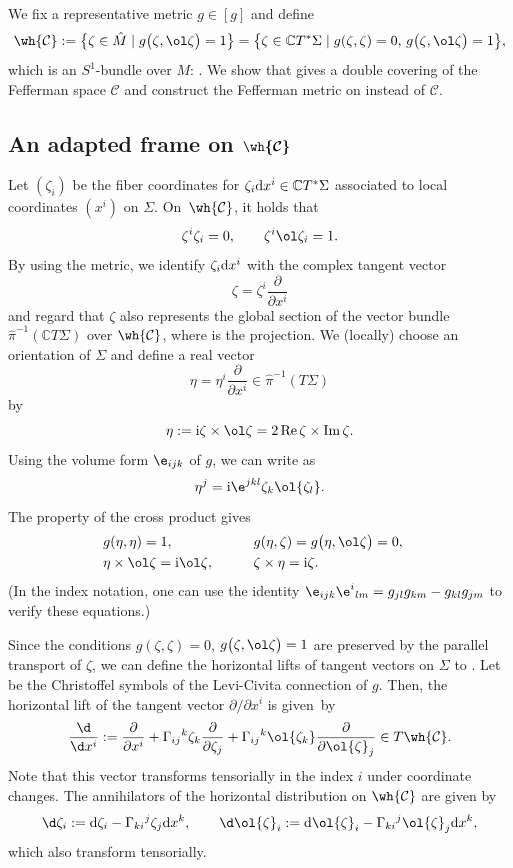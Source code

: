 We fix a representative metric $g\in[g]$ and define
\[
\wh{\mathcal{C}}:=\bigl\{\zeta\in \hat M\mid g\bigl(\zeta, \ol\zeta\bigr)=1\bigr\}
=\bigl\{\zeta\in\mathbb{C}T^*\Sigma\mid g(\zeta, \zeta)=0,\, g\bigl(\zeta, \ol\zeta\bigr)=1\bigr\},
\]
which is an $S^1$-bundle over $M$: .
We show that  gives a double covering of the Fefferman space $\mathcal{C}$ and construct the Fefferman metric on  instead of $\mathcal{C}$.



\subsection[An adapted frame on wh{C}]{An adapted frame on $\boldsymbol{\wh{\mathcal{C}}}$}
Let $(\zeta_i)$ be the fiber coordinates for $\zeta_i{\rm d}x^i\in \mathbb{C}T^*\Sigma$ associated to local coordinates $(x^i)$ on $\Sigma$. On~$\wh{\mathcal{C}}$, it holds that
\[
\zeta^i\zeta_i=0, \qquad \zeta^i\ol\zeta_i=1.
\]
By using the metric, we identify $\zeta_i {\rm d}x^i$ with the complex tangent vector
\[
\zeta=\zeta^i\frac{\partial}{\partial x^i}
\]
and regard that $\zeta$ also represents the global section of the vector bundle
$\hat\pi^{-1}(\mathbb{C}T\Sigma)$ over $\wh{\mathcal{C}}$, where  is the projection. We (locally) choose an orientation of $\Sigma$ and define a real vector
\[
\eta=\eta^i\frac{\partial}{\partial x^i}\in \hat\pi^{-1}(T\Sigma)
\]
by
\[
\eta:={\rm i}\zeta\times \ol\zeta=2\operatorname{Re}\zeta\times \operatorname{Im}\zeta.
\]
Using the volume form $\e_{ijk}$ of $g$, we can write as
\[
\eta^j={\rm i}\e^{jkl}\zeta_k\ol{\zeta_l}.
\]
The property of the cross product gives
\begin{alignat*}{3}
&g(\eta, \eta)=1, \qquad&& g(\eta, \zeta)=g\bigl(\eta, \ol\zeta\bigr)=0,& \\
&\eta\times\ol\zeta={\rm i}\ol\zeta, \qquad&& \zeta\times\eta={\rm i}\zeta.&
\end{alignat*}
(In the index notation, one can use the identity $\e_{ijk}\e^i{}_{lm}=g_{jl}g_{km}-g_{kl}g_{jm}$ to verify these equations.)

Since the conditions $g(\zeta, \zeta)=0$, $g\bigl(\zeta, \ol\zeta\bigr)=1$ are preserved by the parallel transport of $\zeta$, we can define the horizontal lifts of tangent vectors on $\Sigma$ to . Let  be the Christoffel symbols of the Levi-Civita connection of $g$. Then, the horizontal lift of the tangent vector $\partial/\partial x^i$ is given~by
\[
\frac{\d}{\d x^i}:=\frac{\partial}{\partial x^i}+\Gamma_{ij}{}^k\zeta_k\frac{\partial}{\partial \zeta_j}+\Gamma_{ij}{}^k\ol{\zeta_k}\frac{\partial}{\partial \ol{\zeta}_j}\in T\wh{\mathcal{C}}.
\]
Note that this vector transforms tensorially in the index $i$ under coordinate changes. The annihilators of the horizontal distribution on $\wh{\mathcal{C}}$ are given by
\[
\d \zeta_i:={\rm d}\zeta_i-\Gamma_{ki}{}^j \zeta_j {\rm d}x^k, \qquad \d \ol{\zeta}_i:={\rm d}\ol{\zeta}_i-\Gamma_{ki}{}^j \ol{\zeta}_j {\rm d}x^k,
\]
which also transform tensorially.

